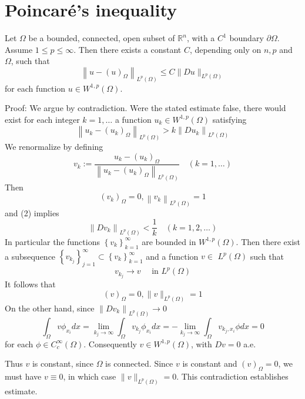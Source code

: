 \section{Poincaré's inequality}
\begin{theorem}
    Let $\Omega$ be a bounded, connected, open subset of $\mathbb{R}^n$, with a $C^1$ boundary $\partial \Omega$. Assume $1 \leq p \leq \infty$. Then there exists a constant $C$, depending only on $n, p$ and $\Omega$, such that
    \[
        \left\|u-(u)_\Omega\right\|_{L^p\left(\Omega\right)} \leq C\|D u\|_{L^p\left(\Omega\right)}
    \]
    for each function $u \in W^{1, p}\left(\Omega\right)$.


    Proof:
    We argue by contradiction. Were the stated estimate false, there would exist for each integer $k=1, \ldots$ a function $u_k \in W^{1, p}\left(\Omega\right)$ satisfying
    \[
        \left\|u_k-\left(u_k\right)_\Omega\right\|_{L^p\left(\Omega\right)}>k\left\|D u_k\right\|_{L^p\left(\Omega\right)}
    \]
    We renormalize by defining
    \[
        v_k:=\frac{u_k-\left(u_k\right)_\Omega}{\left\|u_k-\left(u_k\right)_\Omega\right\|_{L^p\left(\Omega\right)}} \quad(k=1, \ldots)
    \]
    Then
    \[
        \left(v_k\right)_\Omega=0,\left\|v_k\right\|_{L^p\left(\Omega\right)}=1
    \]
    and (2) implies
    \[
        \left\|D v_k\right\|_{L^p\left(\Omega\right)}<\frac{1}{k} \quad(k=1,2, \ldots)
    \]
    In particular the functions $\left\{v_k\right\}_{k=1}^{\infty}$ are bounded in $W^{1, p}\left(\Omega\right)$. Then there exist a subsequence $\left\{v_{k_j}\right\}_{j=1}^{\infty} \subset\left\{v_k\right\}_{k=1}^{\infty}$ and a function $v \in$ $L^p\left(\Omega\right)$ such that
    \[
        v_{k_j} \rightarrow v \quad \text { in } L^p\left(\Omega\right)
    \]
    It follows that
    \[
        (v)_\Omega=0,\|v\|_{L^p\left(\Omega\right)}=1
    \]
    On the other hand, since $\left\|D v_k\right\|_{L^p\left(\Omega\right)} \to 0$
    \[
        \int_\Omega v \phi_{x_i} d x=\lim _{k_j \rightarrow \infty} \int_\Omega v_{k_j} \phi_{x_i} d x=-\lim _{k_j \rightarrow \infty} \int_\Omega v_{k_j, x_i} \phi d x=0
    \]
    for each $\phi \in C_c^{\infty}\left(\Omega\right)$.
    Consequently $v \in W^{1, p}\left(\Omega\right)$, with $D v=0$ a.e.

    Thus $v$ is constant, since $\Omega$ is connected.
    Since $v$ is constant and $(v)_\Omega=0$, we must have $v \equiv 0$, in which case $\|v\|_{L^p\left(\Omega\right)}=0$. This contradiction establishes estimate.
\end{theorem}










